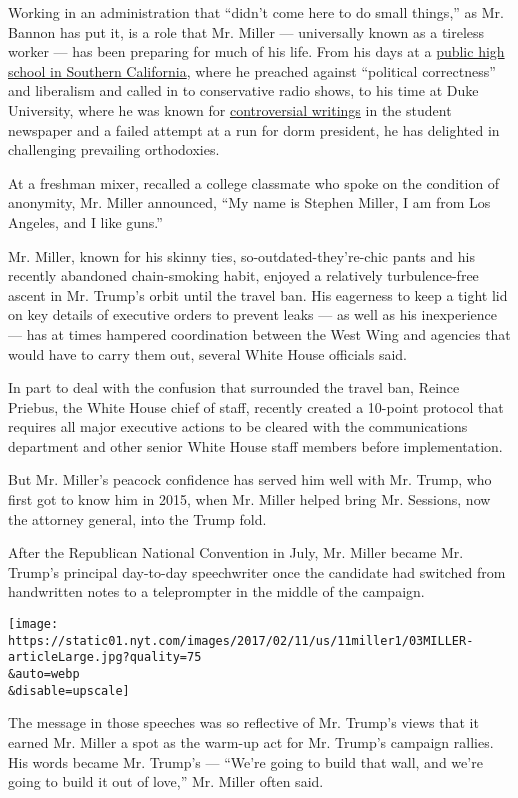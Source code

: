 Working in an administration that ``didn't come here to do small
things,'' as Mr. Bannon has put it, is a role that Mr. Miller ---
universally known as a tireless worker --- has been preparing for much
of his life. From his days at a
\href{http://www.latimes.com/politics/la-na-pol-trump-speechwriter-santamonica-20170117-story.html}{public
high school in Southern California}, where he preached against
``political correctness'' and liberalism and called in to conservative
radio shows, to his time at Duke University, where he was known for
\href{http://www.dukechronicle.com/staff/stephen-miller}{controversial
writings} in the student newspaper and a failed attempt at a run for
dorm president, he has delighted in challenging prevailing orthodoxies.

At a freshman mixer, recalled a college classmate who spoke on the
condition of anonymity, Mr. Miller announced, ``My name is Stephen
Miller, I am from Los Angeles, and I like guns.''

Mr. Miller, known for his skinny ties, so-outdated-they're-chic pants
and his recently abandoned chain-smoking habit, enjoyed a relatively
turbulence-free ascent in Mr. Trump's orbit until the travel ban. His
eagerness to keep a tight lid on key details of executive orders to
prevent leaks --- as well as his inexperience --- has at times hampered
coordination between the West Wing and agencies that would have to carry
them out, several White House officials said.

In part to deal with the confusion that surrounded the travel ban,
Reince Priebus, the White House chief of staff, recently created a
10-point protocol that requires all major executive actions to be
cleared with the communications department and other senior White House
staff members before implementation.

But Mr. Miller's peacock confidence has served him well with Mr. Trump,
who first got to know him in 2015, when Mr. Miller helped bring Mr.
Sessions, now the attorney general, into the Trump fold.

After the Republican National Convention in July, Mr. Miller became Mr.
Trump's principal day-to-day speechwriter once the candidate had
switched from handwritten notes to a teleprompter in the middle of the
campaign.

\texttt{[image: https://static01.nyt.com/images/2017/02/11/us/11miller1/03MILLER-articleLarge.jpg?quality=75\\\&auto=webp\\\&disable=upscale]}

The message in those speeches was so reflective of Mr. Trump's views
that it earned Mr. Miller a spot as the warm-up act for Mr. Trump's
campaign rallies. His words became Mr. Trump's --- ``We're going to
build that wall, and we're going to build it out of love,'' Mr. Miller
often said.

